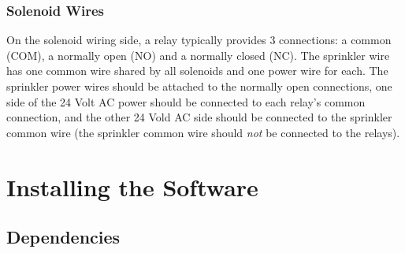 \documentclass[11pt]{book}
\begin{document}
\subsection{Solenoid Wires}
On the solenoid wiring side, a relay typically provides 3 connections: a common (COM), a normally open (NO) and a normally closed (NC). The sprinkler wire has one common wire shared by all solenoids and one power wire for each. The sprinkler power wires should be attached to the normally open connections, one side of the 24 Volt AC power should be connected to each relay's common connection, and the other 24 Vold AC side should be connected to the sprinkler common wire (the sprinkler common wire should \emph{not} be connected to the relays).

\chapter{Installing the Software}
\section{Dependencies}
\end{document}
